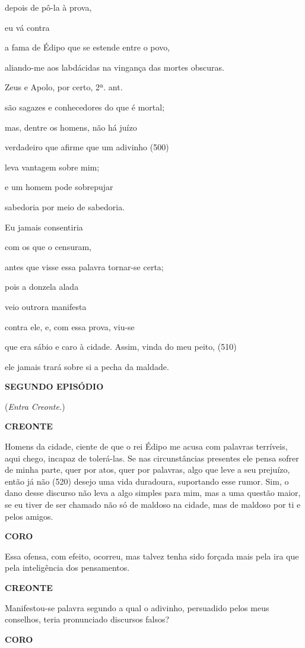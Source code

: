depois de pô-la à prova,

eu vá contra

a fama de Édipo que se estende entre o povo,

aliando-me aos labdácidas na vingança das mortes obscuras.

Zeus e Apolo, por certo, 2ª. ant.

são sagazes e conhecedores do que é mortal;

mas, dentre os homens, não há juízo

verdadeiro que afirme que um adivinho (500)

leva vantagem sobre mim;

e um homem pode sobrepujar

sabedoria por meio de sabedoria.

Eu jamais consentiria

com os que o censuram,

antes que visse essa palavra tornar-se certa;

pois a donzela alada

veio outrora manifesta

contra ele, e, com essa prova, viu-se

que era sábio e caro à cidade. Assim, vinda do meu peito, (510)

ele jamais trará sobre si a pecha da maldade.

\textbf{SEGUNDO EPISÓDIO}

(\emph{Entra Creonte.})

\textbf{CREONTE}

Homens da cidade, ciente de que o rei Édipo me acusa com palavras
terríveis, aqui chego, incapaz de tolerá-las. Se nas circunstâncias
presentes ele pensa sofrer de minha parte, quer por atos, quer por
palavras, algo que leve a seu prejuízo, então já não (520) desejo uma
vida duradoura, suportando esse rumor. Sim, o dano desse discurso não
leva a algo simples para mim, mas a uma questão maior, se eu tiver de
ser chamado não só de maldoso na cidade, mas de maldoso por ti e pelos
amigos.

\textbf{CORO}

Essa ofensa, com efeito, ocorreu, mas talvez tenha sido forçada mais
pela ira que pela inteligência dos pensamentos.

\textbf{CREONTE}

Manifestou-se palavra segundo a qual o adivinho, persuadido pelos meus
conselhos, teria pronunciado discursos falsos?

\textbf{CORO}

